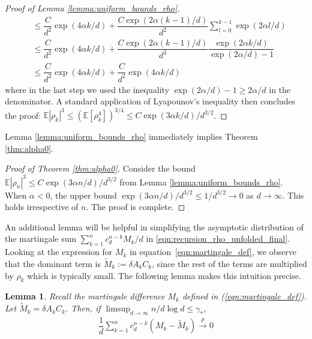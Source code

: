 \documentclass[12pt]{article}
\newtheorem{lemma}[theorem]{Lemma}      %
\def\eqref#1{equation~\ref{#1}}
\newcommand{\E}{\mathbb{E}}
\begin{document}
\begin{proof}[Proof of Lemma \ref{lemma:uniform_bounds_rho}]
\begin{align*}
    &\leq \dfrac{C}{d^2}\exp(4\alpha k/d) + \dfrac{C\exp(2\alpha(k-1)/d)}{d^2}\sum_{l=0}^{k-1}\exp(2\alpha l/d)\\
    &\leq \dfrac{C}{d^2}\exp(4\alpha k/d) + \dfrac{C\exp(2\alpha(k-1)/d)}{d^3}\dfrac{\exp(2\alpha k/d)}{\exp(2\alpha/d)-1}\\
    &\leq \dfrac{C}{d^2}\exp(4\alpha k/d) + \dfrac{C}{d^2}\exp(4\alpha k/d)
\end{align*}where in the last step we used the inequality $\exp(2\alpha/d)-1\geq 2\alpha/d$ in the denominator. A standard application of Lyapounov's inequality then concludes the proof: $\E|\rho_k|^3 \leq (\E[\rho_k^4])^{3/4}\leq C\exp(3\alpha k/d)/d^{3/2}$.
\end{proof}

Lemma \ref{lemma:uniform_bounds_rho} immediately implies Theorem \ref{thm:alpha0}.

\begin{proof}[Proof of Theorem \ref{thm:alpha0}]
    Consider the bound $\E|\rho_n|^3\leq C\exp(3\alpha n/d)/d^{3/2}$ from Lemma \ref{lemma:uniform_bounds_rho}. When $\alpha<0$, the upper bound $\exp(3\alpha n/d)/d^{3/2}\leq 1/d^{3/2}\to 0$ as $d\to\infty$. This holds irrespective of $n$. The proof is complete.
\end{proof}

An additional lemma will be helpful in simplifying the asymptotic distribution of the martingale sum $\sum_{k=1}^n c_d^{n-k}M_k/d$ in \ref{eqn:recursion_rho_unfolded_final}. Looking at the expression for $M_k$ in \eqref{eqn:martingale_def}, we observe that the dominant term is $\tilde M_k:=\delta A_kC_k$, since the rest of the terms are multiplied by $\rho_k$ which is typically small. The following lemma makes this intuition precise.

\begin{lemma}\label{lemma:martingale_simplified}
    Recall the martingale difference $M_k$ defined in (\ref{eqn:martingale_def}). Let $\tilde M_k=\delta A_kC_k$. Then, if $\limsup_{d\to\infty} n/d\log d\leq \gamma_*$,
    \begin{align*}
        \dfrac{1}{d}\sum_{k=1}^n c_d^{n-k}(M_k-\tilde M_k)\stackrel{p}{\to}0
    \end{align*}
\end{lemma}
\end{document}
